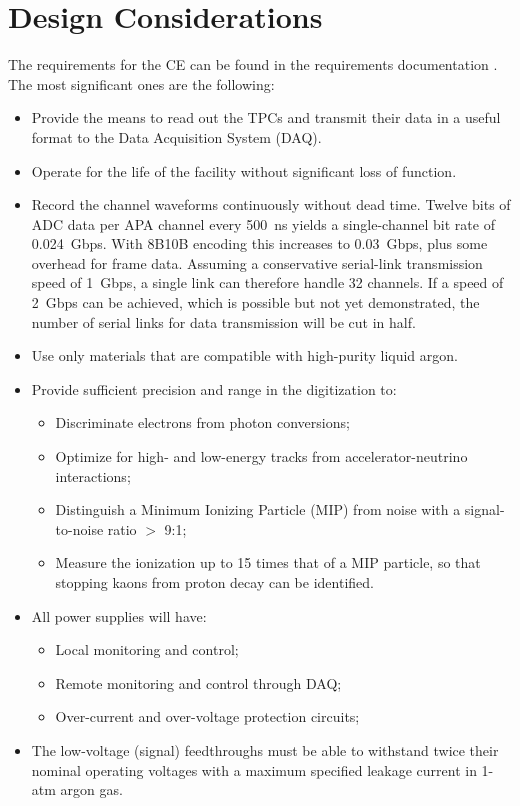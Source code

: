 %
\section{Design Considerations} 
\label{sec:ce_reqs_n_specs}

The requirements for the CE can be found in the requirements documentation \cite{lar-fd-req}.
The most significant ones are the following:

\begin{itemize}	
\item Provide the means to read out the TPCs and transmit their data in a useful format to the Data Acquisition System (DAQ).
\item Operate for the life of the facility without significant loss of function.
\item Record the channel waveforms continuously without dead time.
Twelve bits of ADC data per APA channel every 500~ns yields a single-channel bit rate of 0.024~Gbps.
With 8B10B encoding this increases to 0.03~Gbps, plus some overhead for frame data.
Assuming a conservative serial-link transmission speed of 1~Gbps, a single link can therefore handle 32 channels.
If a speed of 2~Gbps can be achieved, which is possible but not yet demonstrated,
the number of serial links for data transmission will be cut in half.
\item Use only materials that are compatible with high-purity liquid argon.
\item Provide sufficient precision and range in the digitization to:
\begin{itemize}
\item Discriminate electrons from photon conversions;
\item Optimize for high- and low-energy tracks from accelerator-neutrino interactions;
\item Distinguish a Minimum Ionizing Particle (MIP) from noise with a signal-to-noise ratio $>$ 9:1;
\item Measure the ionization up to 15 times that of a MIP particle, so that stopping kaons from proton decay can be identified.
\end{itemize}
\item All power supplies will have:
\begin{itemize}
\item Local monitoring and control;
\item Remote monitoring and control through DAQ;
\item Over-current and over-voltage protection circuits;
\end{itemize}
\item The low-voltage (signal) feedthroughs must be able to withstand twice their nominal operating voltages 
with a maximum specified leakage current in 1-atm argon gas.
\end{itemize}

